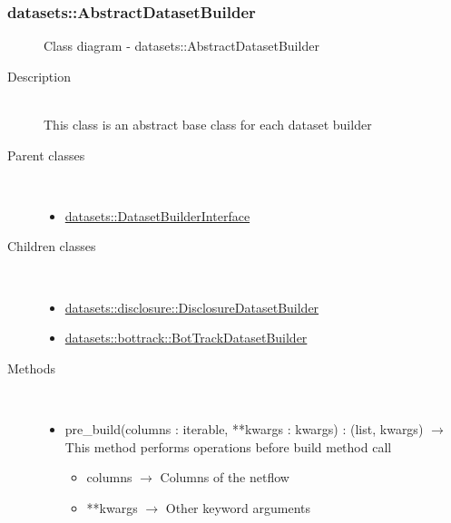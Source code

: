 \subsubsection[AbstractDatasetBuilder]{datasets::AbstractDatasetBuilder}
\begin{figure}[h]
\centering
{}
\caption{Class diagram - datasets::AbstractDatasetBuilder}
\end{figure}\begin{description}
\item[Description] \hfill \\
 This class is an abstract base class for each dataset builder
\item[Parent classes] \hfill \\
 \vspace{-1cm}
\begin{itemize}
\item \hyperlink{datasets::DatasetBuilderInterface}{datasets::DatasetBuilderInterface}
\end{itemize}

\item[Children classes] \hfill \\
 \vspace{-1cm}
\begin{itemize}
\item \hyperlink{datasets::disclosure::DisclosureDatasetBuilder}{datasets::disclosure::DisclosureDatasetBuilder}
\item \hyperlink{datasets::bottrack::BotTrackDatasetBuilder}{datasets::bottrack::BotTrackDatasetBuilder}
\end{itemize}

\item[Methods] \hfill \\
 \vspace{-1cm}
\begin{itemize}
\item pre\_build(columns : iterable, **kwargs : kwargs) : (list, kwargs) $\rightarrow$ This method performs operations before build method call\begin{itemize}
\item columns $\rightarrow$ Columns of the netflow
\item **kwargs $\rightarrow$ Other keyword arguments
\end{itemize}


\end{itemize}
\end{description}
